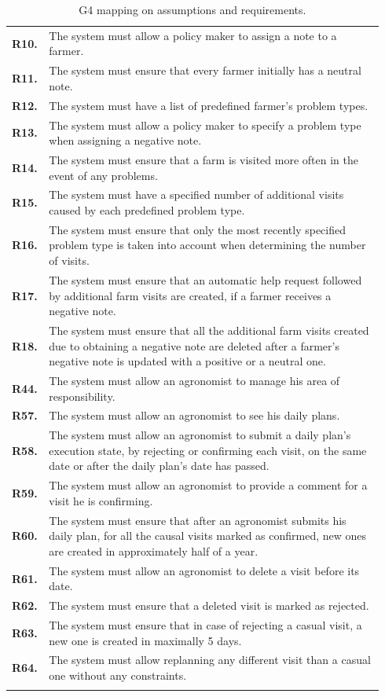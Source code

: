 \begin{longtable}{p{0.06\linewidth} p{0.88\linewidth}}
	\textbf{R10.} & The system must allow a policy maker to assign a note to a farmer.\\
	\textbf{R11.} & The system must ensure that every farmer initially has a neutral note.\\
	\textbf{R12.} & The system must have a list of predefined farmer's problem types.\\
    \textbf{R13.} & The system must allow a policy maker to specify a problem type when assigning a negative note.\\
    \textbf{R14.} & The system must ensure that a farm is visited more often in the event of any problems.\\
    \textbf{R15.} & The system must have a specified number of additional visits caused by each predefined problem type.\\
    \textbf{R16.} & The system must ensure that only the most recently specified problem type is taken into account when determining the number of visits.\\
	\textbf{R17.} & The system must ensure that an automatic help request followed by additional farm visits are created, if a farmer receives a negative note.\\
	\textbf{R18.} & The system must ensure that all the additional farm visits created due to obtaining a negative note are deleted after a farmer's negative note is updated with a positive or a neutral one.\\
	
	\textbf{R44.} & The system must allow an agronomist to manage his area of responsibility.\\
	\textbf{R57.} & The system must allow an agronomist to see his daily plans.\\
	\textbf{R58.} & The system must allow an agronomist to submit a daily plan's execution state, by rejecting or confirming each visit, on the same date or after the daily plan's date has passed. \\
	\textbf{R59.} & The system must allow an agronomist to provide a comment for a visit he is confirming.\\
	\textbf{R60.} & The system must ensure that after an agronomist submits his daily plan, for all the causal visits marked as confirmed, new ones are created in approximately half of a year.\\
	\textbf{R61.} & The system must allow an agronomist to delete a visit before its date.\\
	\textbf{R62.} & The system must ensure that a deleted visit is marked as rejected.\\
	\textbf{R63.} & The system must ensure that in case of rejecting a casual visit, a new one is created in maximally 5 days.\\
	\textbf{R64.} & The system must allow replanning any different visit than a casual one without any constraints.\\
    
    \bottomrule
    \caption{G4 mapping on assumptions and requirements.}
\end{longtable}
    

